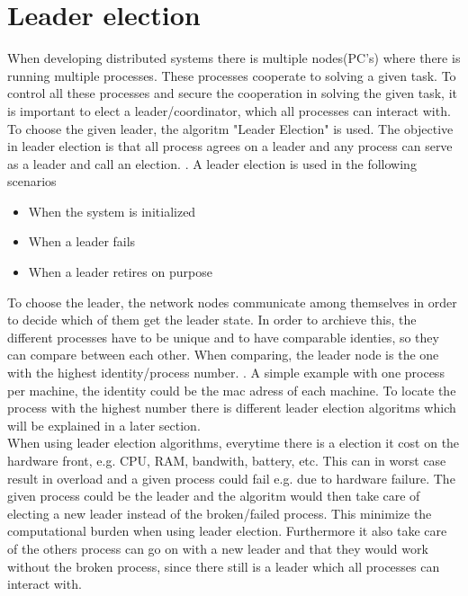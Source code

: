 \documentclass[Main]{subfiles}
\begin{document}
\section{Leader election}
When developing distributed systems there is multiple nodes(PC's) where there is running multiple processes. These processes cooperate to solving a given task. To control all these processes and secure the cooperation in solving the given task, it is important to elect a leader/coordinator, which all processes can interact with. To choose the given leader, the algoritm "Leader Election" is used.  The objective in leader election is that all process agrees on a leader and any process can serve as a leader and call an election. \cite{RMI-slides}. A leader election is used in the following scenarios
\begin{itemize}
\item When the system is initialized
\item When a leader fails
\item When a leader retires on purpose
\end{itemize}
To choose the leader, the network nodes communicate among themselves in order to decide which of them get the leader state. In order to archieve this, the different processes have to be unique and to have comparable identies, so they can compare between each other. When comparing, the leader node is the one with the highest identity/process number. \cite{wiki-Leader}. A simple example with one process per machine, the identity could be the mac adress of each machine.\cite{ElectionAlgorithm}
To locate the process with the highest number there is different leader election algoritms which will be explained in a later section. \\

When using leader election algorithms, everytime there is a election it cost on the hardware front, e.g. CPU, RAM, bandwith, battery, etc.\cite{RMI-slides} This can in worst case result in overload and a given process could fail e.g. due to hardware failure. The given process could be the leader and the algoritm would then take care of electing a new leader instead of the broken/failed process. This minimize the computational burden when using leader election. Furthermore it also take care of the others process can go on with a new leader and that they would work without the broken process, since there still is a leader which all processes can interact with.  \\
\end{document}
